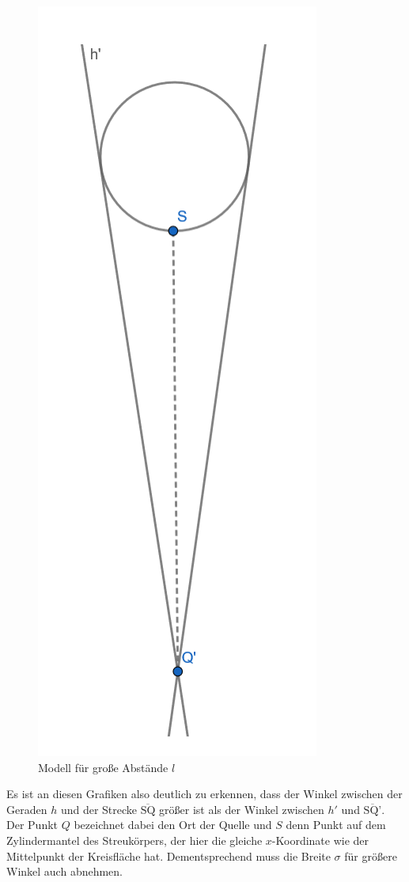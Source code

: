 \documentclass[german,  %
parskip=full,  %
]{scrartcl}
\begin{document}
\begin{figure}[h!]\centering
\includegraphics[scale=0.37]{abstand2}
\caption{Modell für große Abstände $l$}
\end{figure}
\newpage
Es ist an diesen Grafiken also deutlich zu erkennen, dass der Winkel zwischen der Geraden $h$ und der Strecke $\overline{\text{SQ}}$ größer ist als der Winkel zwischen $h'$ und $\overline{\text{SQ'}}$. Der Punkt $Q$ bezeichnet dabei den Ort der Quelle und $S$ denn Punkt auf dem Zylindermantel des Streukörpers, der hier die gleiche $x$-Koordinate wie der Mittelpunkt der Kreisfläche hat. Dementsprechend muss die Breite $\sigma$ für größere Winkel auch abnehmen.
\end{document}
